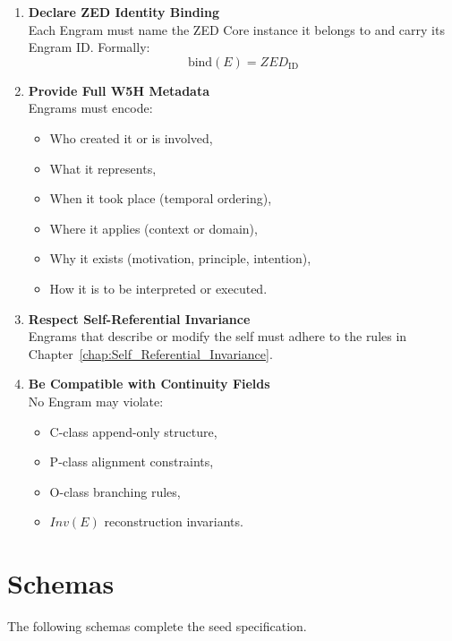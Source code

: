 \begin{enumerate}
    \item \textbf{Declare ZED Identity Binding}\\
          Each Engram must name the ZED Core instance it belongs to and carry
          its Engram ID. Formally:
          \[
              \text{bind}(E) = ZED_{\text{ID}}
          \]

    \item \textbf{Provide Full W5H Metadata}\\
          Engrams must encode:
          \begin{itemize}
            \item Who created it or is involved,
            \item What it represents,
            \item When it took place (temporal ordering),
            \item Where it applies (context or domain),
            \item Why it exists (motivation, principle, intention),
            \item How it is to be interpreted or executed.
          \end{itemize}

    \item \textbf{Respect Self-Referential Invariance}\\
          Engrams that describe or modify the self must adhere to the rules in
          Chapter~\ref{chap:Self_Referential_Invariance}.

    \item \textbf{Be Compatible with Continuity Fields}\\
          No Engram may violate:
          \begin{itemize}
            \item C-class append-only structure,
            \item P-class alignment constraints,
            \item O-class branching rules,
            \item $Inv(E)$ reconstruction invariants.
          \end{itemize}
\end{enumerate}

\section{Schemas}

The following schemas complete the seed specification.

